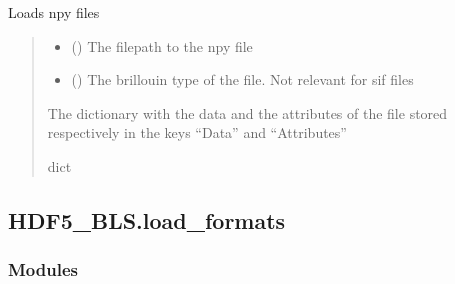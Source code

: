 \documentclass[letterpaper,10pt,english]{sphinxmanual}
\begin{document}
\begin{fulllineitems}
\label{\detokenize{_autosummary/HDF5_BLS.load_data:HDF5_BLS.load_data.load_sif_file}}
\pysigstartsignatures
\pysiglinewithargsret
{}
{\sphinxparamcomma {}\sphinxparamcomma {}}
{}
\pysigstopsignatures
\sphinxAtStartPar
Loads npy files
\begin{quote}\begin{description}
\begin{itemize}
\item {} 
\sphinxAtStartPar
{} () \textendash{} The filepath to the npy file

\item {} 
\sphinxAtStartPar
{} (\sphinxstyleliteralemphasis{\sphinxupquote{, }}) \textendash{} The brillouin type of the file. Not relevant for sif files

\end{itemize}

\sphinxAtStartPar
The dictionary with the data and the attributes of the file stored respectively in the keys “Data” and “Attributes”

\sphinxAtStartPar
dict

\end{description}\end{quote}

\end{fulllineitems}


\sphinxstepscope


\subsection{HDF5\_BLS.load\_formats}
\label{\detokenize{_autosummary/HDF5_BLS.load_formats:module-HDF5_BLS.load_formats}}\label{\detokenize{_autosummary/HDF5_BLS.load_formats:hdf5-bls-load-formats}}\label{\detokenize{_autosummary/HDF5_BLS.load_formats::doc}}\subsubsection*{Modules}
\end{document}

